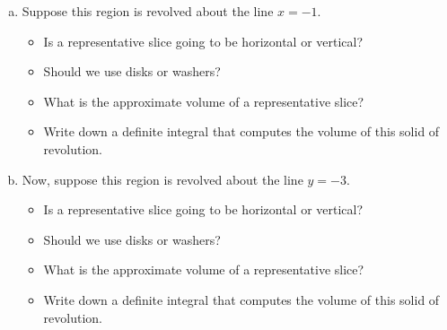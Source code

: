 \begin{enumerate}[(a), leftmargin=20pt]
	\item Suppose this region is revolved about the line $x = -1$.
	\begin{itemize}
		\item Is a representative slice going to be horizontal or vertical?
		\item Should we use disks or washers?
		\item What is the approximate volume of a representative slice?
		\item Write down a definite integral that computes the volume of this solid of revolution.
	\end{itemize}

	\vfill

	\item Now, suppose this region is revolved about the line $y=-3$.
	\begin{itemize}
		\item Is a representative slice going to be horizontal or vertical?
		\item Should we use disks or washers?
		\item What is the approximate volume of a representative slice?
		\item Write down a definite integral that computes the volume of this solid of revolution.
	\end{itemize}

	\vfill
\end{enumerate}

